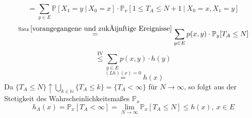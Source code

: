 \begin{equation*}
= \sum_{y \in E} \mathbb{P}[X_{1} = y \: | \: X_{0} = x] \cdot \mathbb{P}_{\nu}[1 \leq T_{A} \leq N+1 \: | \: X_{0} = x, X_{1} = y]
\end{equation*}
\begin{equation*}
\stackrel{\mathrm{Satz} \: \ref{vorangegangene und zukünftige Ereignisse}}{=} \sum_{y \in E} p(x,y) \cdot \mathbb{P}_{y}[T_{A} \leq N]
\end{equation*}
\begin{equation*}
\stackrel{\mathrm{IV}}{\leq}\sum_{y \in E} p(x,y) \cdot h(y)
\end{equation*}
\begin{equation*}
\stackrel{(Lh)(x) = 0}{=}h(x)
\end{equation*}
Da $\lbrace T_{A} \leq N \rbrace \uparrow \bigcup_{k \in \mathbb{N}} \lbrace T_{A} \leq k \rbrace = \lbrace T_{A} < \infty \rbrace$ für $N \to \infty$, so folgt aus der Stetigkeit des Wahrscheinlichkeitsmaßes $\mathbb{P}_{x}$
\begin{equation*}
h_{A}(x) = \mathbb{P}_{x}[T_{A} < \infty] = \lim_{N \to \infty} \mathbb{P}_{x}[T_{A} \leq N] \leq h(x), \: x \in E
\end{equation*}